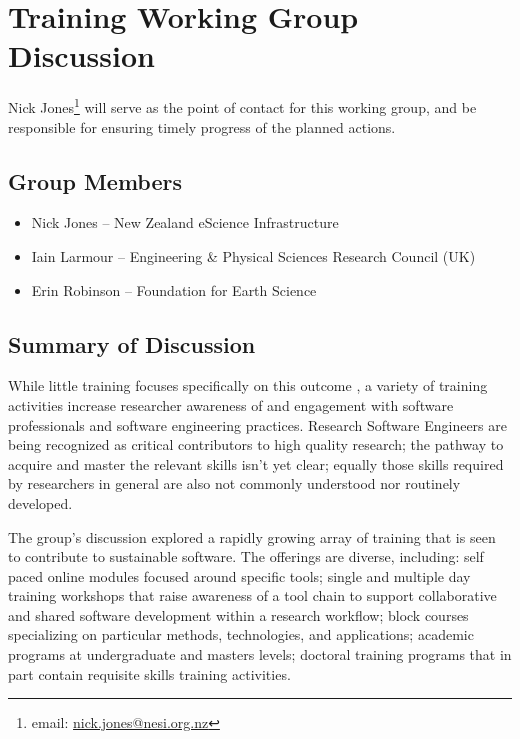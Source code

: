 \section{Training Working Group Discussion}
\label{sec:appendix_training}

Nick Jones\footnote{email: \href{mailto:nick.jones@nesi.org.nz}{nick.jones@nesi.org.nz}} will serve as the point of contact for this working group, and be responsible for ensuring timely progress of the planned actions.

\subsection{Group Members}
\begin{itemize}
\item Nick Jones -- New Zealand eScience Infrastructure
\item Iain Larmour -- Engineering \& Physical Sciences Research Council (UK)
\item Erin Robinson -- Foundation for Earth Science
\end{itemize}

\subsection{Summary of Discussion}


While little training focuses specifically on this outcome , a variety of training activities increase researcher awareness of and engagement with software professionals and software engineering practices. Research Software Engineers are being recognized as critical contributors to high quality research; the pathway to acquire and master the relevant skills isn't yet clear; equally those skills required by researchers in general are also not commonly understood nor routinely developed.

The group's discussion explored a rapidly growing array of training that is seen to contribute to sustainable software. The offerings are diverse, including: self paced online modules focused around specific tools; single and multiple day training workshops that raise awareness of a tool chain to support collaborative and shared software development within a research workflow; block courses specializing on particular methods, technologies, and applications; academic programs at undergraduate and masters levels; doctoral training programs that in part contain requisite skills training activities.

